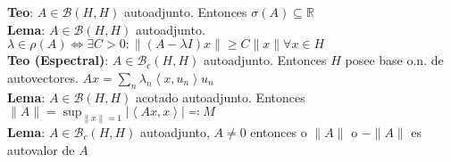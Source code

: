 \documentclass[9pt]{extarticle}
\newcommand{\R}{\mathbb{R}}
\newcommand{\inn}[1]{\left\langle #1\right\rangle}
\begin{document}
\begin{multicols*}{2}
\textbf{Teo}: $A\in\mathcal{B}(H,H)$ autoadjunto. Entonces $\sigma(A)\subseteq \R$\\
\textbf{Lema}: $A\in\mathcal{B}(H,H)$ autoadjunto. $\lambda\in\rho(A)\iff \exists C>0:\|(A-\lambda I)x\|\geq C\|x\|\forall x\in H$\\
\textbf{Teo (Espectral)}: $A\in\mathcal{B}_c(H,H)$ autoadjunto. Entonces $H$ posee base o.n. de autovectores. $Ax=\sum_n \lambda_n\inn{x,u_n}u_n$\\
\textbf{Lema}: $A\in\mathcal{B}(H,H)$ acotado autoadjunto. Entonces $\|A\|=\sup_{\|x\|=1}|\inn{Ax,x}|\eqqcolon M$\\
\textbf{Lema}: $A\in\mathcal{B}_c(H,H)$ autoadjunto, $A\neq 0$ entonces o $\|A\|$ o $-\|A\|$ es autovalor de $A$

\end{multicols*}
\end{document}
